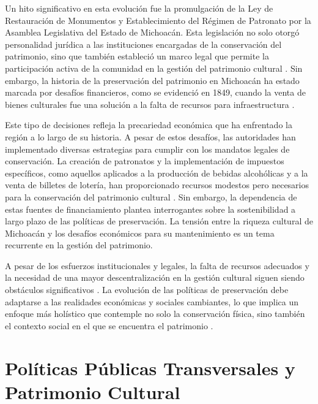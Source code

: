 \documentclass[
  spanish,
  11pt,
  a4paper,
]{scrbook}
\begin{document}
Un hito significativo en esta evolución fue la promulgación de la Ley de
Restauración de Monumentos y Establecimiento del Régimen de Patronato
por la Asamblea Legislativa del Estado de Michoacán. Esta legislación no
solo otorgó personalidad jurídica a las instituciones encargadas de la
conservación del patrimonio, sino que también estableció un marco legal
que permite la participación activa de la comunidad en la gestión del
patrimonio cultural \autocite{Moreno2023}. Sin embargo, la historia de
la preservación del patrimonio en Michoacán ha estado marcada por
desafíos financieros, como se evidenció en 1849, cuando la venta de
bienes culturales fue una solución a la falta de recursos para
infraestructura \autocite{Serrano2021}.

Este tipo de decisiones refleja la precariedad económica que ha
enfrentado la región a lo largo de su historia. A pesar de estos
desafíos, las autoridades han implementado diversas estrategias para
cumplir con los mandatos legales de conservación. La creación de
patronatos y la implementación de impuestos específicos, como aquellos
aplicados a la producción de bebidas alcohólicas y a la venta de
billetes de lotería, han proporcionado recursos modestos pero necesarios
para la conservación del patrimonio cultural \autocite{Moreno2023}. Sin
embargo, la dependencia de estas fuentes de financiamiento plantea
interrogantes sobre la sostenibilidad a largo plazo de las políticas de
preservación. La tensión entre la riqueza cultural de Michoacán y los
desafíos económicos para su mantenimiento es un tema recurrente en la
gestión del patrimonio.

A pesar de los esfuerzos institucionales y legales, la falta de recursos
adecuados y la necesidad de una mayor descentralización en la gestión
cultural siguen siendo obstáculos significativos \autocite{Moreno2023}.
La evolución de las políticas de preservación debe adaptarse a las
realidades económicas y sociales cambiantes, lo que implica un enfoque
más holístico que contemple no solo la conservación física, sino también
el contexto social en el que se encuentra el patrimonio
\autocite{Moreno2023}.

\section*{Políticas Públicas Transversales y Patrimonio
Cultural}\label{poluxedticas-puxfablicas-transversales-y-patrimonio-cultural}

\end{document}
